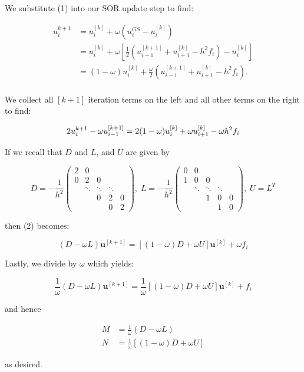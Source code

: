 \begin{solution}
    \pagebreak
    We substitute (1) into our SOR update step to find:

    \begin{align*}
        u_i^{k+1} &= u_i^{[k]} + \omega \left( u_i^{GS} - u_i^{[k]} \right) \\
                  &= u_i^{[k]} + \omega \left[ \frac{1}{2} \left( u_{i-1}^{[k+1]} + u_{i+1}^{[k]} - h^2 f_i \right) - u_i^{[k]} \right] \\
                  &= (1 - \omega) u_i^{[k]} + \frac{\omega}{2} \left( u_{i-1}^{[k+1]} + u_{i+1}^{[k]} - h^2 f_i \right). \\
    \end{align*}

    We collect all $[k+1]$ iteration terms on the left and all other terms on the right to find:

    \begin{equation}
        2 u_i^{k+1} - \omega u_{i-1}^{[k+1]} = 2 (1 - \omega) u_i^{[k]} + \omega u_{i+1}^{[k]} - \omega h^2 f_i \\
    \end{equation}

    If we recall that $D$ and $L$, and $U$ are given by

    \[
    D = -\frac{1}{h^2} \begin{pmatrix} 
         2 &       0 \\
         0 &       2 &      0 \\
           & \ddots & \ddots & \ddots \\
           &        &      0 &      2 &  0 \\
           &        &        &      0 &  2 
    \end{pmatrix},\;
    L = -\frac{1}{h^2} \begin{pmatrix} 
         0 &       0 \\
         1 &       0 &      0 \\
           & \ddots & \ddots & \ddots \\
           &        &      1 &      0 & 0 \\
           &        &        &      1 & 0 
    \end{pmatrix}, \;
    U = L^T
    \]

    then (2) becomes:

    $$
        (D - \omega L) \textbf{u}^{[k+1]} = \left[(1 - \omega) D + \omega U \right] \textbf{u}^{[k]} + \omega f_i
    $$

    Lastly, we divide by $\omega$ which yields:

    $$
        \frac{1}{\omega} (D - \omega L) \textbf{u}^{[k+1]} = \frac{1}{\omega} \left[(1 - \omega) D + \omega U \right] \textbf{u}^{[k]} + f_i
    $$

    and hence 

    \begin{align*}
        M &= \frac{1}{\omega} (D - \omega L) \\
        N &= \frac{1}{\omega} \left[(1 - \omega) D + \omega U \right]
    \end{align*}

    as desired.
    \ \\
\end{solution}